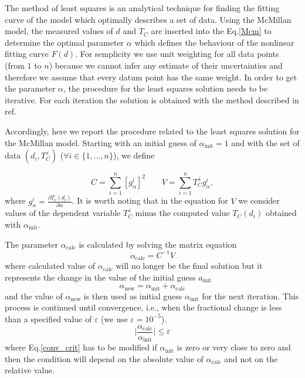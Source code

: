 \documentclass[reprint,onecolumn,superscriptaddress,a4paper,nofootinbib,floatfix]{revtex4-1}
\begin{document}
The method of least squares is an analytical technique for finding the fitting curve of the model which optimally describes a set of data. Using the McMillan model, the measured values of $d$ and $T_C$ are inserted into the Eq.\ref{Mcm} to determine the optimal parameter $\alpha$ which defines the behaviour of the nonlinear fitting curve $F(d)$. For semplicity we use unit weighting for all data points (from $1$ to $n$) because we cannot infer any estimate of their uncertainties and therefore we assume that every datum point has the same weight. In order to get the parameter $\alpha$, the procedure for the least squares solution needs to be iterative. For each iteration the solution is obtained with the method described in ref.\cite{Wol} 

Accordingly, here we report the procedure related to the least squares solution for the McMillan model. Starting with an initial guess of $\alpha_\text{init}=1$ and with the set of data $(d_i,T_C^{\,i})$ ($\forall i \in \lbrace{1,\ldots,n}\rbrace$), we define

\begin{equation}\tag{S3}
\label{mat_elem}
C=\sum_{i=1}^n \left[g^i_{\alpha}\right]^2 \qquad V=\sum_{i=1}^n T_C^{\,i}g^i_\alpha,
\end{equation}
where $g^i_\alpha=\frac{\partial T_c(d_i)}{\partial\alpha}$. It is worth noting that in the equation for $V$ we consider values of the dependent variable $T_C^{\,i}$ minus the computed value $T_C(d_i)$ obtained with $\alpha_\text{init}$. 

The parameter $\alpha_\text{calc}$ is calculated by solving the matrix equation
\begin{equation}\tag{S4}
\label{Avect}
\alpha_\text{calc}=C^{-1}V
\end{equation}
where calculated value of $\alpha_\text{calc}$ will no longer be the final solution but it represents the change in the value of the initial guess $a_\text{init}$
\begin{equation}\tag{S5}
\alpha_\text{new}=\alpha_\text{init} +\alpha_\text{calc}
\end{equation}
and the value of $\alpha_\text{new}$ is then used as initial guess $\alpha_\text{init}$ for the next iteration. This process is continued until convergence, i.e., when the fractional change is less than a specified value of $\varepsilon$ (we use $\varepsilon = 10^{-5}$). 
\begin{equation}\tag{S6}
\label{conv_crit}
\bigg|\frac{\alpha_\text{calc}}{\alpha_\text{init}}\bigg|\leqslant\varepsilon
\end{equation}
where Eq.\ref{conv_crit} has to be modified if $\alpha_\text{init}$ is zero or very close to zero and then the condition will depend on the absolute value of $\alpha_\text{calc}$ and not on the relative value.
\end{document}
